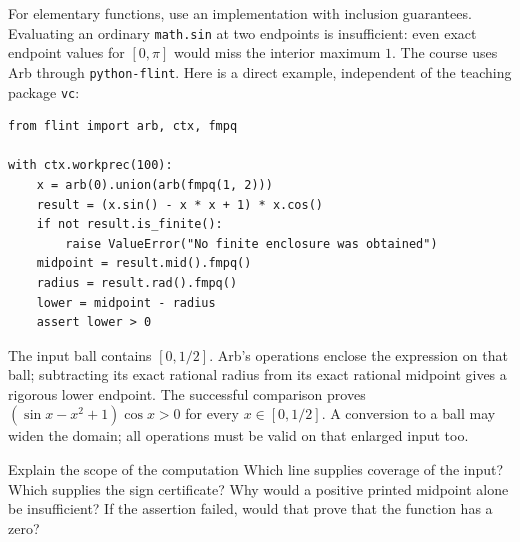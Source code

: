 For elementary functions, use an implementation with inclusion guarantees.
Evaluating an ordinary \texttt{math.sin} at two endpoints is insufficient:
even exact endpoint values for $[0,\pi]$ would miss the interior maximum $1$.
The course uses Arb through \texttt{python-flint}. Here is a direct example,
independent of the teaching package \texttt{vc}:

\begin{lstlisting}
from flint import arb, ctx, fmpq

with ctx.workprec(100):
    x = arb(0).union(arb(fmpq(1, 2)))
    result = (x.sin() - x * x + 1) * x.cos()
    if not result.is_finite():
        raise ValueError("No finite enclosure was obtained")
    midpoint = result.mid().fmpq()
    radius = result.rad().fmpq()
    lower = midpoint - radius
    assert lower > 0
\end{lstlisting}

The input ball contains $[0,1/2]$. Arb's operations enclose the expression
on that ball; subtracting its exact rational radius from its exact rational
midpoint gives a rigorous lower endpoint. The successful comparison proves
$(\sin x-x^2+1)\cos x>0$ for every $x\in[0,1/2]$. A conversion to a ball
may widen the domain; all operations must be valid on that enlarged input too.

\begin{question}{Explain the scope of the computation}
Which line supplies coverage of the input? Which supplies the sign
certificate? Why would a positive printed midpoint alone be insufficient?
If the assertion failed, would that prove that the function has a zero?
\end{question}


\newpage
{}

